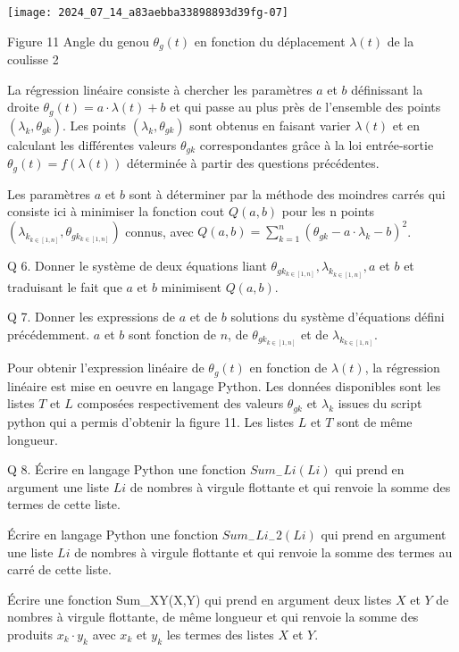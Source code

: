 \begin{center}
\texttt{[image: 2024\_07\_14\_a83aebba33898893d39fg-07]}
\end{center}

Figure 11 Angle du genou $\theta_{g}(t)$ en fonction du déplacement $\lambda(t)$ de la coulisse 2

La régression linéaire consiste à chercher les paramètres $a$ et $b$ définissant la droite $\theta_{g}(t)=a \cdot \lambda(t)+b$ et qui passe au plus près de l'ensemble des points $\left(\lambda_{k}, \theta_{g k}\right)$. Les points $\left(\lambda_{k}, \theta_{g k}\right)$ sont obtenus en faisant varier $\lambda(t)$ et en calculant les différentes valeurs $\theta_{g k}$ correspondantes grâce à la loi entrée-sortie $\theta_{g}(t)=f(\lambda(t))$ déterminée à partir des questions précédentes.

Les paramètres $a$ et $b$ sont à déterminer par la méthode des moindres carrés qui consiste ici à minimiser la fonction cout $Q(a, b)$ pour les n points $\left(\lambda_{k_{k \in[1, n]}}, \theta_{g k_{k \in[1, n]}}\right)$ connus, avec $Q(a, b)=\sum_{k=1}^{n}\left(\theta_{g k}-a \cdot \lambda_{k}-b\right)^{2}$.

Q 6. Donner le système de deux équations liant $\theta_{g k_{k \in[1, n]}}, \lambda_{k_{k \in[1, n]}}, a$ et $b$ et traduisant le fait que $a$ et $b$ minimisent $Q(a, b)$.

Q 7. Donner les expressions de $a$ et de $b$ solutions du système d'équations défini précédemment. $a$ et $b$ sont fonction de $n$, de $\theta_{g k_{k \in[1, n]}}$ et de $\lambda_{k_{k \in[1, n]}}$.

Pour obtenir l'expression linéaire de $\theta_{g}(t)$ en fonction de $\lambda(t)$, la régression linéaire est mise en oeuvre en langage Python. Les données disponibles sont les listes $T$ et $L$ composées respectivement des valeurs $\theta_{g k}$ et $\lambda_{k}$ issues du script python qui a permis d'obtenir la figure 11. Les listes $L$ et $T$ sont de même longueur.

Q 8. Écrire en langage Python une fonction $S u m_{-} L i(L i)$ qui prend en argument une liste $L i$ de nombres à virgule flottante et qui renvoie la somme des termes de cette liste.

Écrire en langage Python une fonction $S u m_{-} L i_{-} 2(L i)$ qui prend en argument une liste $L i$ de nombres à virgule flottante et qui renvoie la somme des termes au carré de cette liste.

Écrire une fonction Sum\_XY(X,Y) qui prend en argument deux listes $X$ et $Y$ de nombres à virgule flottante, de même longueur et qui renvoie la somme des produits $x_{k} \cdot y_{k}$ avec $x_{k}$ et $y_{k}$ les termes des listes $X$ et $Y$.

